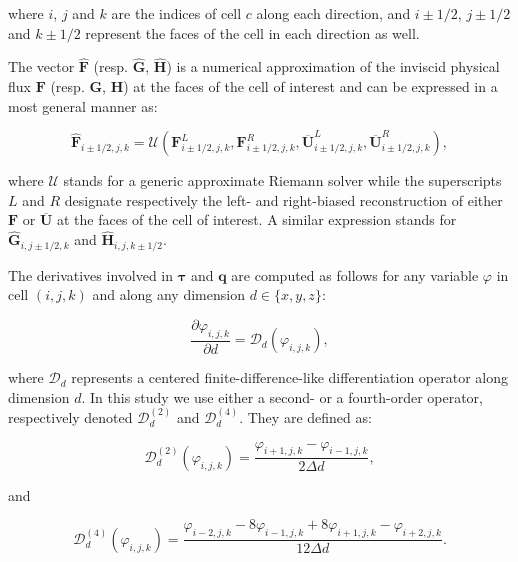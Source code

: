 where $i$, $j$ and $k$ are the indices of cell $c$ along each direction, and $i\pm1/2$, $j\pm1/2$ and $k\pm1/2$ represent the faces of the cell in each direction as well.

The vector $\hat{\mathbf{F}}$ (resp. $\hat{\mathbf{G}}$, $\hat{\mathbf{H}}$) is a numerical approximation of the inviscid physical flux $\mathbf{F}$ (resp. $\mathbf{G}$, $\mathbf{H}$) at the faces of the cell of interest and can be expressed in a most general manner as:

\begin{equation}
    \hat{\mathbf{F}}_{i\pm1/2,j,k} = \mathcal{U}\left( \mathbf{F}^{L}_{i\pm1/2,j,k}, \mathbf{F}^{R}_{i\pm1/2,j,k},
    \overline{\mathbf{U}}^{L}_{i\pm1/2,j,k}, \overline{\mathbf{U}}^{R}_{i\pm1/2,j,k} \right),
    \label{eq:num_approx_flux}
\end{equation}

where $\mathcal{U}$ stands for a generic approximate Riemann solver while the superscripts $L$ and $R$ designate respectively the left- and right-biased reconstruction of either $\mathbf{F}$ or $\overline{\mathbf{U}}$ at the faces of the cell of interest.
A similar expression stands for $\hat{\mathbf{G}}_{i, j \pm 1/2,k}$ and $\hat{\mathbf{H}}_{i, j,k \pm 1/2}$.

The derivatives involved in $\boldsymbol{\tau}$ and $\mathbf{q}$ are computed as follows for any variable $\varphi$ in cell $(i,j,k)$ and along any dimension $d\in\lbrace x,y,z \rbrace$:

\begin{equation}
    \dfrac{\partial \varphi_{i,j,k}}{\partial d} = \mathcal{D}_d\left( \varphi_{i,j,k} \right),
\end{equation}

where $\mathcal{D}_d$ represents a centered finite-difference-like differentiation operator along dimension $d$.
In this study we use either a second- or a fourth-order operator, respectively denoted $\mathcal{D}^{(2)}_d$ and $\mathcal{D}^{(4)}_d$.
They are defined as:

\begin{equation}
    \mathcal{D}^{(2)}_d(\varphi_{i,j,k}) = \dfrac{\varphi_{i+1,j,k} - \varphi_{i-1,j,k}}{2\Delta d},
    \label{eq:para_operator_2}
\end{equation}

and

\begin{equation}
    \mathcal{D}^{(4)}_d(\varphi_{i,j,k}) = \dfrac{\varphi_{i-2,j,k} - 8\varphi_{i-1,j,k} + 8\varphi_{i+1,j,k} - \varphi_{i+2,j,k}}{12\Delta d}.
    \label{eq:para_operator_4}
\end{equation}

